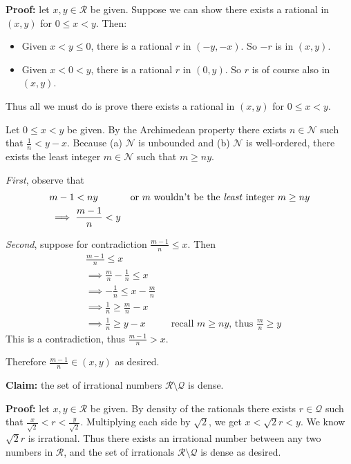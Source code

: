 \textbf{Proof:} let $x,y\in\mathcal{R}$ be given. Suppose we can show there exists
a rational in $(x, y)$ for $0\leq x<y$. Then:
\begin{itemize}
\item Given $x<y\leq0$, there is a rational $r$ in $(-y, -x)$. So $-r$ is
  in $(x,y)$.
\item Given $x<0<y$, there is a rational $r$ in $(0,y)$. So $r$ is of
  course also in $(x,y)$.
\end{itemize}
Thus all we must do is prove there exists a rational in $(x, y)$ for
$0\leq x<y$.

\vs

Let $0\leq x<y$ be given. By the Archimedean property there exists
$n\in\mathcal{N}$ such that $\frac{1}{n}<y-x$. Because (a)
$\mathcal{N}$ is unbounded and (b) $\mathcal{N}$ is well-ordered, there exists the least
integer $m\in\mathcal{N}$ such that $m\geq ny$.

\vs

\textit{First}, observe that
\begin{align*}
&m-1<ny&&\text{or $m$ wouldn't be the \textit{least} integer $m\geq
          ny$}\\
&\implies\frac{m-1}{n}<y\\
\end{align*}

\textit{Second}, suppose for contradiction $\frac{m-1}{n}\leq x$. Then
\begin{align*}
  &\frac{m-1}{n}\leq x\\
  &\implies \frac{m}{n}-\frac{1}{n}\leq x\\
  &\implies -\frac{1}{n}\leq x-\frac{m}{n}\\
  &\implies \frac{1}{n}\geq \frac{m}{n}-x\\
  &\implies \frac{1}{n}\geq y-x&&\text{recall $m\geq ny$, thus $\frac{m}{n}\geq
                               y$}
\end{align*}
This is a contradiction, thus $\frac{m-1}{n}>x$.

\vs

Therefore $\frac{m-1}{n}\in(x,y)$ as desired.

\vs

\textbf{Claim:} the set of irrational numbers $\mathcal{R}\setminus\mathcal{Q}$ is dense.

\textbf{Proof:} let $x,y\in\mathcal{R}$ be given. By density of the rationals
there exists $r\in\mathcal{Q}$ such that
$\frac{x}{\sqrt{2}}<r<\frac{y}{\sqrt{2}}$. Multiplying each side by
$\sqrt{2}$, we get $x<\sqrt{2}r<y$. We know $\sqrt{2}r$ is irrational.
Thus there exists an irrational number between any two numbers in
$\mathcal{R}$, and the set of irrationals $\mathcal{R}\setminus\mathcal{Q}$ is dense as desired.

